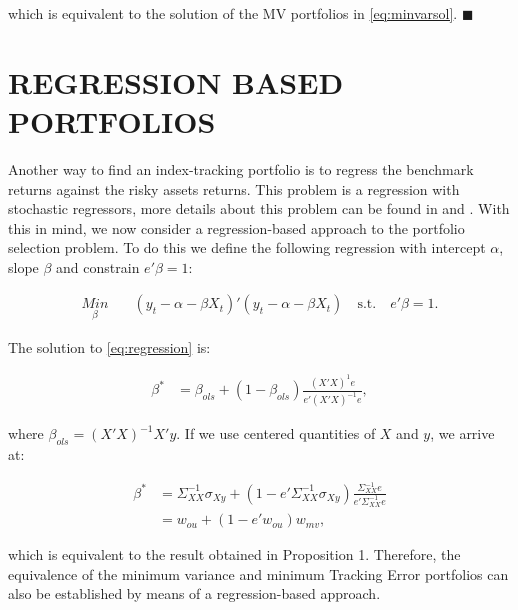 \documentclass[12pt,oneside,a4paper]{memoir}
\begin{document}
\noindent
which is equivalent to the solution of the MV portfolios in \eqref{eq:minvarsol}. $\blacksquare$

\section{REGRESSION BASED PORTFOLIOS} \label{sec:regression}

Another way to find an index-tracking portfolio is to regress the benchmark returns against the risky assets returns.
This problem is a regression with stochastic regressors, more details about this problem can be found in  and .
With this in mind, we now consider a regression-based approach to the portfolio selection problem.
To do this we define the following regression with intercept $\alpha$, slope $\beta$ and constrain $e'\beta=1$:

\begin{align}
\label{eq:regression} 
\underset{\beta}{Min} & \quad (y_t - \alpha - \beta X_t)'(y_t - \alpha - \beta X_t)
\quad \text{s.t.} \quad  e'\beta=1.
\end{align}

\noindent
The solution to \eqref{eq:regression} is:

\begin{align*}
\beta^* &= \beta_{ols} + (1 - \beta_{ols}) \frac{(X'X)^{1}e}{e'(X'X)^{-1}e},
\end{align*}

\noindent
where $\beta_{ols} = (X'X)^{-1}X'y$. If we use centered quantities of $X$ and $y$, we arrive at:

\begin{align*}
\beta^* &= \Sigma_{XX}^{-1} \sigma_{Xy}
+ (1 - e'\Sigma_{XX}^{-1} \sigma_{Xy})
\frac{\Sigma_{XX}^{-1}e}{e'\Sigma_{XX}^{-1}e}
\\
 &= w_{ou} + (1 - e'w_{ou})w_{mv}, 
\end{align*}

\noindent
which is equivalent to the result obtained in Proposition 1. Therefore, the equivalence of the minimum variance and minimum Tracking Error portfolios can also be established by means of a regression-based approach.

\end{document}
